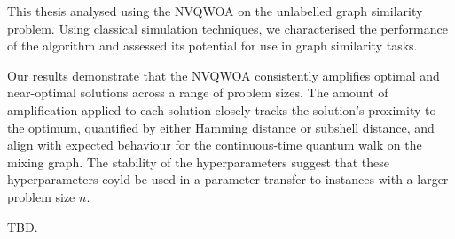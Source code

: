 This thesis analysed using the NVQWOA on the unlabelled graph similarity problem. Using classical simulation techniques, we characterised the performance of the algorithm and assessed its potential for use in graph similarity tasks.

Our results demonstrate that the NVQWOA consistently amplifies optimal and near-optimal solutions across a range of problem sizes. The amount of amplification applied to each solution closely tracks the solution's proximity to the optimum, quantified by either Hamming distance or subshell distance, and align with expected behaviour for the continuous-time quantum walk on the mixing graph. The stability of the hyperparameters suggest that these hyperparameters coyld be used in a parameter transfer to instances with a larger problem size $n$.

TBD.